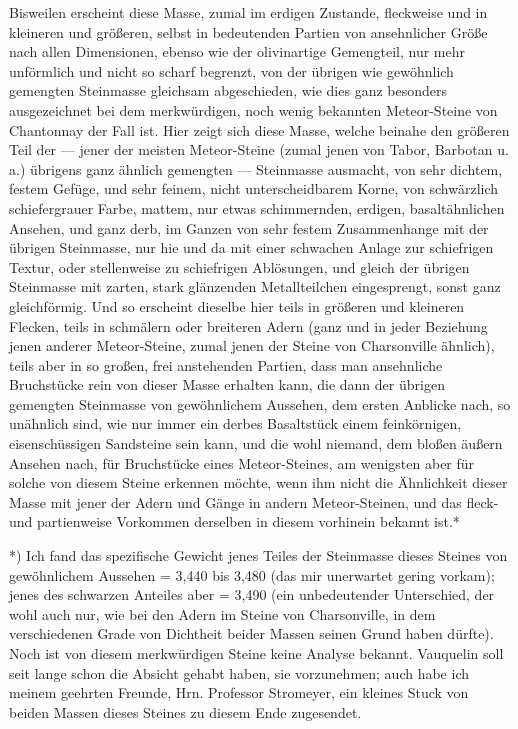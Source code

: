 \documentclass[a4paper, 11pt, oneside, german]{article}
\begin{document}
Bisweilen erscheint diese Masse, zumal im erdigen Zustande, fleckweise und in kleineren und größeren, selbst in bedeutenden Partien von ansehnlicher Größe nach allen Dimensionen, ebenso wie der olivinartige Gemengteil, nur mehr unförmlich und nicht so scharf begrenzt, von der übrigen wie gewöhnlich gemengten Steinmasse gleichsam abgeschieden, wie dies ganz besonders ausgezeichnet bei dem merkwürdigen, noch wenig bekannten Meteor-Steine von Chantonnay der Fall ist. Hier zeigt sich diese Masse, welche beinahe den größeren Teil der --- jener der meisten Meteor-Steine (zumal jenen von Tabor, Barbotan u. a.) übrigens ganz ähnlich gemengten --- Steinmasse ausmacht, von sehr dichtem, festem Gefüge, und sehr feinem, nicht unterscheidbarem Korne, von schwärzlich schiefergrauer Farbe, mattem, nur etwas schimmernden, erdigen, basaltähnlichen Ansehen, und ganz derb, im Ganzen von sehr festem Zusammenhange mit der übrigen Steinmasse, nur hie und da mit einer schwachen Anlage zur schiefrigen Textur, oder stellenweise zu schiefrigen Ablösungen, und gleich der übrigen Steinmasse mit zarten, stark glänzenden Metallteilchen eingesprengt, sonst ganz gleichförmig. Und so erscheint dieselbe hier teils in größeren und kleineren Flecken, teils in schmälern oder breiteren Adern (ganz und in jeder Beziehung jenen anderer Meteor-Steine, zumal jenen der Steine von Charsonville ähnlich), teils aber in so großen, frei anstehenden Partien, dass man ansehnliche Bruchstücke rein von dieser Masse erhalten kann, die dann der übrigen gemengten Steinmasse von gewöhnlichem Aussehen, dem ersten Anblicke nach, so unähnlich sind, wie nur immer ein derbes Basaltstück einem feinkörnigen, eisenschüssigen Sandsteine sein kann, und die wohl niemand, dem bloßen äußern Ansehen nach, für Bruchstücke eines Meteor-Steines, am wenigsten aber für solche von diesem Steine erkennen möchte, wenn ihm nicht die Ähnlichkeit dieser Masse mit jener der Adern und Gänge in andern Meteor-Steinen, und das fleck- und partienweise Vorkommen derselben in diesem vorhinein bekannt ist.*

*) Ich fand das spezifische Gewicht jenes Teiles der Steinmasse dieses Steines von gewöhnlichem Aussehen = 3,440 bis 3,480 (das mir unerwartet gering vorkam); jenes des schwarzen Anteiles aber = 3,490 (ein unbedeutender Unterschied, der wohl auch nur, wie bei den Adern im Steine von Charsonville, in dem verschiedenen Grade von Dichtheit beider Massen seinen Grund haben dürfte). Noch ist von diesem merkwürdigen Steine keine Analyse bekannt. Vauquelin soll seit lange schon die Absicht gehabt haben, sie vorzunehmen; auch habe ich meinem geehrten Freunde, Hrn. Professor Stromeyer, ein kleines Stuck von beiden Massen dieses Steines zu diesem Ende zugesendet.
\end{document}
